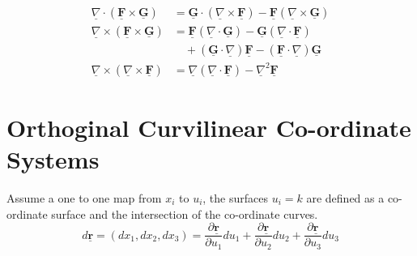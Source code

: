 \documentclass{article}
\renewcommand{\vec}[1]{\underline{\textbf{#1}}}
\newcommand{\nab}{\underline{\nabla}}
\newcommand{\pd}[2]{\frac{\partial #1}{\partial #2}}
\renewcommand{\div}{\nab \cdot}
\newcommand{\curl}{\nab \times}
\begin{document}
\begin{align}
  \div(\vec F\times \vec G) &= \vec G \cdot(\curl\vec F) - \vec F(\curl \vec G)\\
  \curl(\vec F\times \vec G) &= \vec F(\div \vec G) - \vec G(\div \vec F)\\
  &\quad + (\vec G \cdot\nab)\vec F - (\vec F \cdot\nab)\vec G\\
  \curl(\curl\vec F) &= \nab(\div\vec F) - \nab^2\vec F
\end{align}


\section{Orthoginal Curvilinear Co-ordinate Systems}
Assume a one to one map from $x_i$ to $u_i$, the surfaces $u_i = k$ are defined as a co-ordinate surface and the intersection of the co-ordinate curves.
$$ d\vec r = (dx_1, dx_2, dx_3) = \pd{\vec r}{u_1} du_1 + \pd{\vec r}{u_2}du_2 + \pd{\vec r}{u_3}du_3 $$
\end{document}
